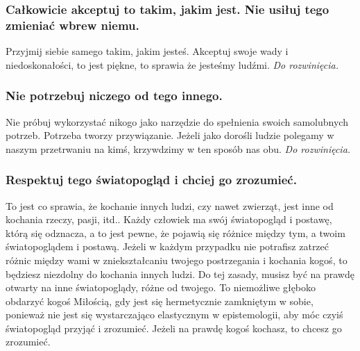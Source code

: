 \documentclass[../dotknieci-miloscia.tex]{subfiles}
\begin{document}
\subsubsection{Całkowicie akceptuj to takim, jakim jest. Nie usiłuj tego zmieniać wbrew niemu.}
Przyjmij siebie samego takim, jakim jesteś.
Akceptuj swoje wady i niedoskonałości, to jest piękne, to sprawia że jesteśmy ludźmi.
\emph{Do rozwinięcia.}

\subsubsection{Nie potrzebuj niczego od tego innego.}
Nie próbuj wykorzystać nikogo jako narzędzie do spełnienia swoich samolubnych potrzeb.
Potrzeba tworzy przywiązanie.
Jeżeli jako dorośli ludzie polegamy w naszym przetrwaniu na kimś, 
krzywdzimy w ten sposób nas obu.
\emph{Do rozwinięcia.}

\subsubsection{Respektuj tego światopogląd i chciej go zrozumieć.}
To jest co sprawia, że kochanie innych ludzi, czy nawet zwierząt, 
jest inne od kochania rzeczy, pasji, itd..
Każdy człowiek ma swój światopogląd i postawę, którą się odznacza, 
a to jest pewne, że pojawią się różnice między tym, a twoim światopoglądem i postawą. 
Jeżeli w każdym przypadku nie potrafisz zatrzeć różnic między wami w 
zniekształcaniu twojego postrzegania i kochania kogoś, 
to będziesz niezdolny do kochania innych ludzi. 
Do tej zasady, musisz być na prawdę otwarty na inne światopoglądy, różne od twojego. 
To niemożliwe głęboko obdarzyć kogoś Miłością, gdy jest się hermetycznie zamkniętym w sobie, 
ponieważ nie jest się wystarczająco elastycznym w epistemologii, 
aby móc czyiś światopogląd przyjąć i zrozumieć. 
Jeżeli na prawdę kogoś kochasz, to chcesz go zrozumieć.
\end{document}
